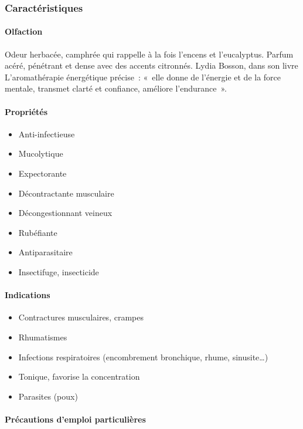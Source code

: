 \documentclass[12pt,a4wide]{article}
\begin{document}
\subsubsection{Caractéristiques}
\label{sec-4-9-1}
\paragraph{Olfaction}
\label{sec-4-9-1-1}
Odeur herbacée, camphrée qui rappelle à la fois l'encens et l'eucalyptus. Parfum acéré, pénétrant et dense avec des accents citronnés.
Lydia Bosson, dans son livre L'aromathérapie énergétique précise : « elle donne de l'énergie et de la force mentale, transmet clarté et confiance, améliore l'endurance ».


\paragraph{Propriétés}
\label{sec-4-9-1-2}

\begin{itemize}
\item Anti-infectieuse
\item Mucolytique
\item Expectorante
\item Décontractante musculaire
\item Décongestionnant veineux
\item Rubéfiante
\item Antiparasitaire
\item Insectifuge, insecticide
\end{itemize}

\paragraph{Indications}
\label{sec-4-9-1-3}

\begin{itemize}
\item Contractures musculaires, crampes
\item Rhumatismes
\item Infections respiratoires (encombrement bronchique, rhume, sinusite…)
\item Tonique, favorise la concentration
\item Parasites (poux)
\end{itemize}

\paragraph{Précautions d'emploi particulières}
\label{sec-4-9-1-4}
\end{document}
